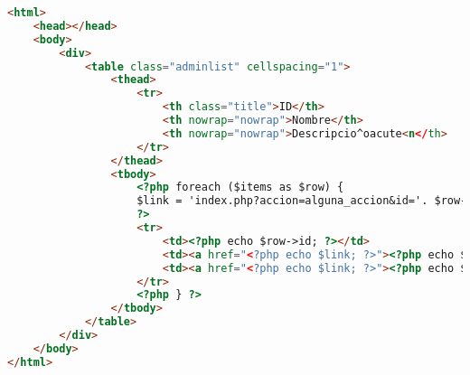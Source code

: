 \begin{lstlisting}[label=mvp_vista,caption=Vista,language=HTML]
<html>
	<head></head>
	<body>
		<div>
		    <table class="adminlist" cellspacing="1">
    			<thead>
		        	<tr>
						<th class="title">ID</th>
                		<th nowrap="nowrap">Nombre</th>
		                <th nowrap="nowrap">Descripcio^oacute<n</th>
        		    </tr>
		        </thead>
        		<tbody>
		        	<?php foreach ($items as $row) {
        			$link = 'index.php?accion=alguna_accion&id='. $row->id;
		        	?>
        		    <tr>
                		<td><?php echo $row->id; ?></td>
		                <td><a href="<?php echo $link; ?>"><?php echo $row->nombre; ?></a></td>
        		        <td><a href="<?php echo $link; ?>"><?php echo $row->descripcion; ?></a></td>
		            </tr>
        		    <?php } ?>
		        </tbody>
		    </table>
		</div>
	</body>
</html>
\end{lstlisting}
